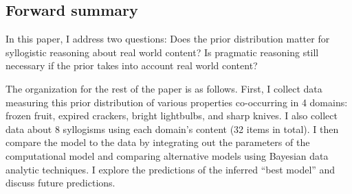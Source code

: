 \documentclass{article} %
\begin{document}
\subsection{Forward summary}

In this paper, I address two questions: Does the prior distribution matter for syllogistic reasoning about real world content? Is pragmatic reasoning still necessary if the prior takes into account real world content? 

The organization for the rest of the paper is as follows. First, I collect data measuring this prior distribution of various properties co-occurring in 4 domains: frozen fruit, expired crackers, bright lightbulbs, and sharp knives. I also collect data about 8 syllogisms using each domain's content (32 items in total). I then compare the model to the data by integrating out the parameters of the computational model and comparing alternative models using Bayesian data analytic techniques. I explore the predictions of the inferred ``best model'' and discuss future predictions. 

%
\end{document}
